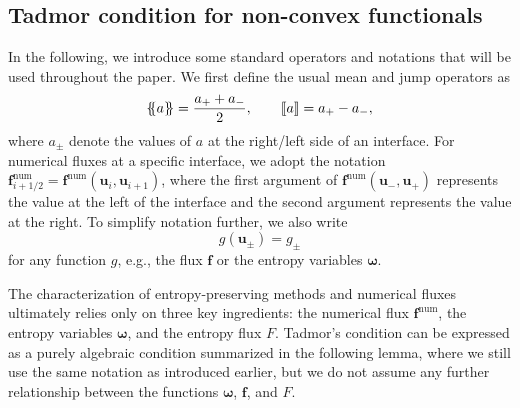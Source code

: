 \documentclass[]{scrartcl}
\newcommand*{\ldblbrace}{\{\mskip-5mu \left \{}
\newcommand*{\rdblbrace}{ \}\mskip-5mu \right \}}
\newcommand{\mean}[1]{\left\ldblbrace #1 \right\rdblbrace}
\renewcommand{\vec}[1]{\boldsymbol{#1}}
\newcommand{\jump}[1]{\left\llbracket #1  \right\rrbracket}
\theoremstyle{definition}
\begin{document}
\subsection{Tadmor condition for non-convex functionals}{\label{tadmor_non_convex_entropies}}
In the following, we introduce some standard operators and notations that will be used throughout the paper. We first define the usual mean and jump operators as
\begin{equation}
\mean{a} = \frac{a_+ + a_-}{2}, \qquad \jump{a} = a_+ - a_-,
\end{equation}
where $a_\pm$ denote the values of $a$ at the right/left side of an interface.
For numerical fluxes at a specific interface, we adopt the notation
$\vec{f}^{\mathrm{num}}_{i+1/2} = \vec{f}^{\mathrm{num}}(\vec{u}_{i}, \vec{u}_{i+1})$,
where the first argument of $\vec{f}^{\mathrm{num}}(\vec{u}_-, \vec{u}_+)$ represents the value at the left of the interface and the second argument represents the value at the right.
To simplify notation further, we also write
\begin{equation}
g(\vec{u}_\pm) = g_\pm
\end{equation}
for any function $g$, e.g., the flux $\vec{f}$ or the entropy variables $\vec{\omega}$.

The characterization of entropy-preserving methods and numerical fluxes ultimately relies only on three key ingredients: the numerical flux $\vec{f}^{\mathrm{num}}$, the entropy variables $\vec{\omega}$, and the entropy flux $F$.
Tadmor's condition can be expressed as a purely algebraic condition summarized in the following lemma, where we still use the same notation as introduced earlier, but we do not assume any further relationship between the functions $\vec{\omega}$, $\vec{f}$, and $F$.
\end{document}
